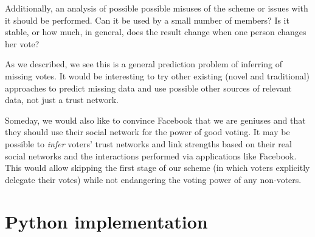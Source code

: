 \documentclass[a4paper]{acm_proc_article-sp}
\begin{document}
Additionally, an analysis of possible possible misuses of the scheme or issues with it should be performed. Can it be used by a
small number of members? Is it stable, or how much, in general, does the result change when one person changes her vote?

As we described, we see this is a general prediction problem of inferring of missing votes. It would be interesting to try
other existing (novel and traditional) approaches to predict missing data and use possible other sources of relevant data,
not just a trust network.

Someday, we would also like to convince Facebook that we are geniuses and that they should use their social network for the
power of good voting.  It may be possible to \emph{infer} voters' trust networks and link strengths based on their real social networks and the
interactions performed via applications like Facebook.  This would allow skipping the first stage of our scheme (in which voters
explicitly delegate their votes) while not endangering the voting power of any non-voters.




\onecolumn

\appendix
\section{Python implementation}

\vspace{1em}

\small

\end{document}
